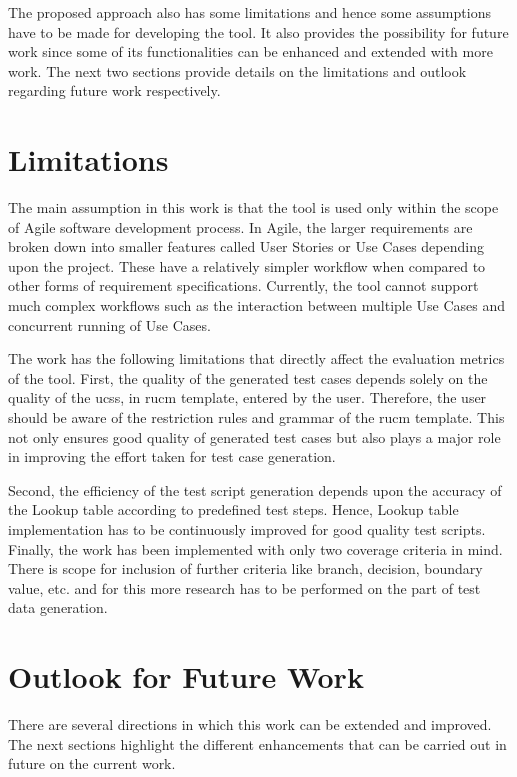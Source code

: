 The proposed approach also has some limitations and hence some assumptions have to be made for developing the tool. It also provides the possibility for future work since some of its functionalities can be enhanced and extended with more work. The next two sections provide details on the limitations and outlook regarding future work respectively.

 
\section{Limitations}
The main assumption in this work is that the tool is used only within the scope of Agile software development process. In Agile, the larger requirements are broken down into smaller features called User Stories or Use Cases depending upon the project. These have a relatively simpler workflow when compared to other forms of requirement specifications. Currently, the tool cannot support much complex workflows such as the interaction between multiple Use Cases and concurrent running of Use Cases.

The work has the following limitations that directly affect the evaluation metrics of the tool. First, the quality of the generated test cases depends solely on the quality of the \glspl{ucs}, in \gls{rucm} template, entered by the user. Therefore, the user should be aware of the restriction rules and grammar of the \gls{rucm} template. This not only ensures good quality of generated test cases but also plays a major role in improving the effort taken for test case generation.  

Second, the efficiency of the test script generation depends upon the accuracy of the Lookup table according to predefined test steps. Hence, Lookup table implementation has to be continuously improved for good quality test scripts. Finally, the work has been implemented with only two coverage criteria in mind. There is scope for inclusion of further criteria like branch, decision, boundary value, etc. and for this more research has to be performed on the part of test data generation.


\section{Outlook for Future Work}
There are several directions in which this work can be extended and improved. The next sections highlight the different enhancements that can be carried out in future on the current work.

